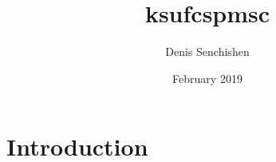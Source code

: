 \documentclass{article}
\title{ksufcspmsc}
\author{Denis Senchishen}
\date{February 2019}
\begin{document}
\maketitle

\section{Introduction}
\end{document}
